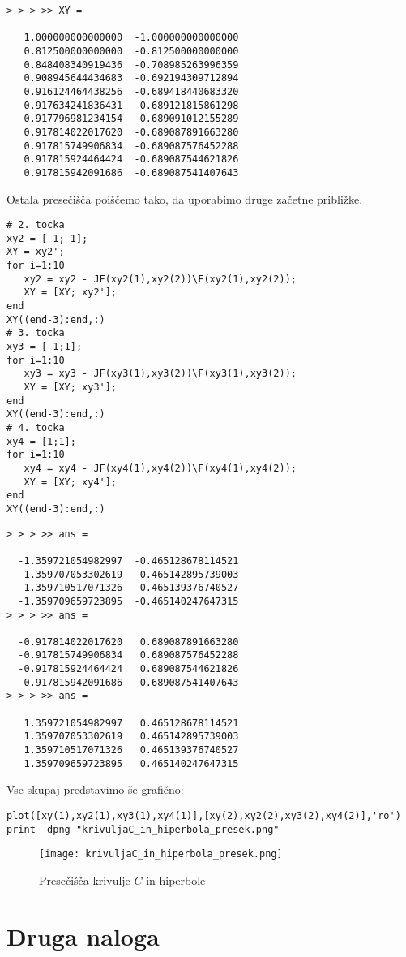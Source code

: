 \documentclass[11pt]{article}
\begin{document}
\begin{verbatim}
> > > >> XY =

   1.000000000000000  -1.000000000000000
   0.812500000000000  -0.812500000000000
   0.848408340919436  -0.708985263996359
   0.908945644434683  -0.692194309712894
   0.916124464438256  -0.689418440683320
   0.917634241836431  -0.689121815861298
   0.917796981234154  -0.689091012155289
   0.917814022017620  -0.689087891663280
   0.917815749906834  -0.689087576452288
   0.917815924464424  -0.689087544621826
   0.917815942091686  -0.689087541407643
\end{verbatim}
Ostala presečišča poiščemo tako, da uporabimo druge začetne približke.
\begin{verbatim}
# 2. tocka
xy2 = [-1;-1];
XY = xy2';
for i=1:10
   xy2 = xy2 - JF(xy2(1),xy2(2))\F(xy2(1),xy2(2));
   XY = [XY; xy2'];
end
XY((end-3):end,:)
# 3. tocka
xy3 = [-1;1];
for i=1:10
   xy3 = xy3 - JF(xy3(1),xy3(2))\F(xy3(1),xy3(2));
   XY = [XY; xy3'];
end
XY((end-3):end,:)
# 4. tocka
xy4 = [1;1];
for i=1:10
   xy4 = xy4 - JF(xy4(1),xy4(2))\F(xy4(1),xy4(2));
   XY = [XY; xy4'];
end
XY((end-3):end,:)
\end{verbatim}

\begin{verbatim}
> > > >> ans =

  -1.359721054982997  -0.465128678114521
  -1.359707053302619  -0.465142895739003
  -1.359710517071326  -0.465139376740527
  -1.359709659723895  -0.465140247647315
> > > >> ans =

  -0.917814022017620   0.689087891663280
  -0.917815749906834   0.689087576452288
  -0.917815924464424   0.689087544621826
  -0.917815942091686   0.689087541407643
> > > >> ans =

   1.359721054982997   0.465128678114521
   1.359707053302619   0.465142895739003
   1.359710517071326   0.465139376740527
   1.359709659723895   0.465140247647315
\end{verbatim}
Vse skupaj predstavimo še grafično:
\begin{verbatim}
plot([xy(1),xy2(1),xy3(1),xy4(1)],[xy(2),xy2(2),xy3(2),xy4(2)],'ro')
print -dpng "krivuljaC_in_hiperbola_presek.png"
\end{verbatim}
\begin{figure}[htb]
\centering
\texttt{[image: krivuljaC\_in\_hiperbola\_presek.png]}
\caption{Presečišča krivulje \(C\) in hiperbole}
\end{figure}

\section{Druga naloga}
\label{sec:orgheadline8}
\end{document}
